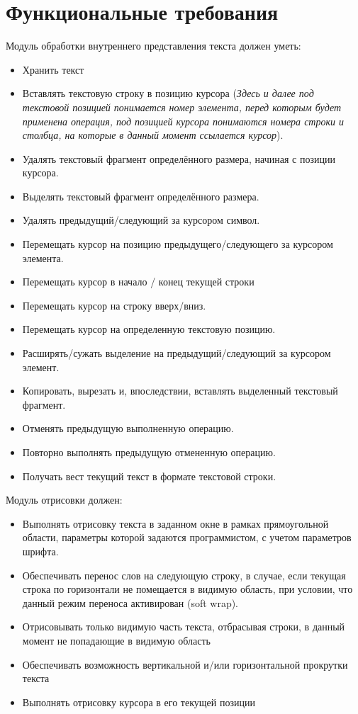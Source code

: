 \documentclass{fefu}
\begin{document}
	\section{Функциональные требования}
		\par Модуль обработки внутреннего представления текста должен уметь:
		\begin{itemize}
			\item Хранить текст
			\item Вставлять текстовую строку в позицию курсора (\textit{Здесь и далее под текстовой позицией 
			понимается номер элемента, перед которым будет применена операция, под
			позицией курсора понимаются номера строки и столбца, на которые в данный момент
			ссылается курсор}).
			\item Удалять текстовый фрагмент определённого размера, 
			начиная с позиции курсора.
			\item Выделять текстовый фрагмент определённого размера.
			\item Удалять предыдущий/следующий за курсором символ.
			\item Перемещать курсор на позицию предыдущего/следующего
			за курсором элемента.
			\item Перемещать курсор в начало / конец текущей строки
			\item Перемещать курсор на строку вверх/вниз.
			\item Перемещать курсор на определенную текстовую позицию.
			\item Расширять/сужать выделение на предыдущий/следующий за курсором элемент.
			\item Копировать, вырезать и, впоследствии, вставлять выделенный текстовый 
			фрагмент.
			\item Отменять предыдущую выполненную операцию.
			\item Повторно выполнять предыдущую отмененную операцию.
			\item Получать вест текущий текст в формате текстовой 
			строки.
		\end{itemize}
		\par Модуль отрисовки должен:
		\begin{itemize}
			\item Выполнять отрисовку текста в заданном окне в рамках прямоугольной области, 
			параметры которой задаются программистом, с учетом параметров шрифта.
			\item Обеспечивать перенос слов на следующую строку, в случае, если
			текущая строка по горизонтали не помещается в видимую область, при условии, что 
			данный режим переноса активирован (soft wrap).
			\item Отрисовывать только видимую часть текста, отбрасывая строки, в данный момент
			не попадающие в видимую область
			\item Обеспечивать возможность вертикальной и/или горизонтальной прокрутки 
			текста
			\item Выполнять отрисовку курсора в его текущей позиции
		\end{itemize}
\end{document}
